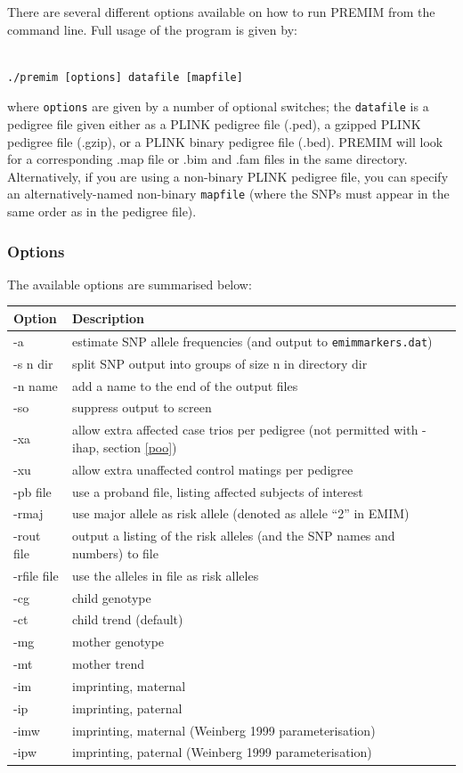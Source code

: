 \documentclass[a4paper,12pt]{article}
\newcommand{\code}[1]{{\footnotesize{{\tt #1}}}}
\begin{document}
There are several different options available on how to run PREMIM from the command line. Full usage of the program is given by: 
\vspace{0.35cm} \begin{lstlisting}

./premim [options] datafile [mapfile]

\end{lstlisting} \vspace{0.35cm}
where \code{options} are given by a number of optional switches; the \code{datafile} is a pedigree file given either as a PLINK pedigree file (.ped), a gzipped PLINK pedigree file (.gzip), or a PLINK binary pedigree file (.bed). PREMIM will look for a corresponding .map file or .bim and .fam files in the same directory. Alternatively, if you are using a non-binary PLINK pedigree file, you can specify an alternatively-named non-binary \code{mapfile} (where the SNPs must appear in the same order as in the pedigree file). 
\subsubsection{Options}
\label{premim-options}

The available options are summarised below: 

{\begin{center}\begin{tabular}{ll}
Option  & Description\\
\hline
-a  & estimate SNP allele frequencies (and output to \code{emimmarkers.dat})\\
-s n dir  & split SNP output into groups of size n in directory dir\\
-n name  & add a name to the end of the output files\\
-so  & suppress output to screen\\
-xa  & allow extra affected case trios per pedigree (not permitted with -ihap,  section \ref{poo}) \\
-xu  & allow extra unaffected control matings per pedigree\\
-pb file  & use a proband file, listing affected subjects of interest\\
-rmaj  & use major allele as risk allele (denoted as allele ``2'' in EMIM)\\
-rout file  & output a listing of the risk alleles (and the SNP names and numbers) to file\\
-rfile file  & use the alleles in file as risk alleles\\
-cg  & child genotype\\
-ct  & child trend (default)\\
-mg  & mother genotype\\
-mt  & mother trend\\
-im  & imprinting, maternal\\
-ip  & imprinting, paternal\\
-imw  & imprinting, maternal (Weinberg 1999 parameterisation)\\
-ipw  & imprinting, paternal (Weinberg 1999 parameterisation)\\
\end{tabular}\end{center}}
\end{document}
